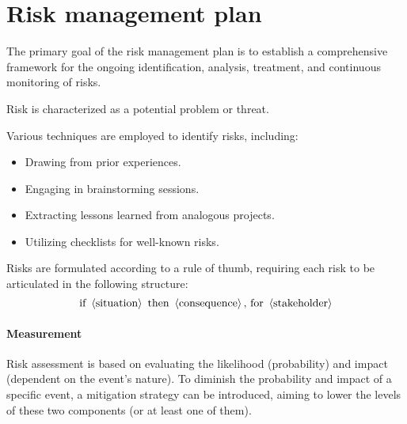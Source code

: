 \section{Risk management plan}

The primary goal of the risk management plan is to establish a comprehensive framework for the ongoing identification, analysis, treatment, and continuous monitoring of risks.
\begin{definition}
    Risk is characterized as a potential problem or threat.
\end{definition}
Various techniques are employed to identify risks, including:
\begin{itemize}
    \item Drawing from prior experiences.
    \item Engaging in brainstorming sessions.
    \item Extracting lessons learned from analogous projects.
    \item Utilizing checklists for well-known risks.
\end{itemize}
Risks are formulated according to a rule of thumb, requiring each risk to be articulated in the following structure:
\[\textnormal{if }\left\langle \textnormal{situation} \right\rangle\textnormal{ then }\left\langle \textnormal{consequence} \right\rangle\textnormal{, for }\left\langle \textnormal{stakeholder} \right\rangle \]

\paragraph*{Measurement}
Risk assessment is based on evaluating the likelihood (probability) and impact (dependent on the event's nature). 
To diminish the probability and impact of a specific event, a mitigation strategy can be introduced, aiming to lower the levels of these two components (or at least one of them).